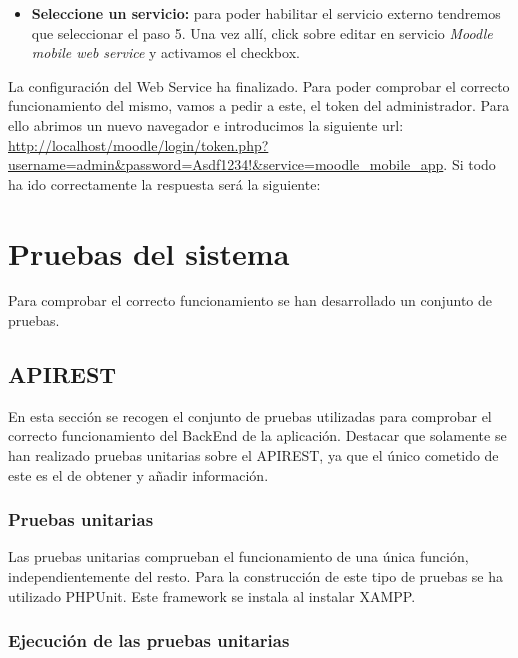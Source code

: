 \begin{itemize}
\begin{itemize}
		\item \textbf{Seleccione un servicio:} para poder habilitar el servicio externo tendremos que seleccionar el paso 5. Una vez allí, click sobre editar en servicio \emph{Moodle mobile web service} y activamos el checkbox.
		
	
	\end{itemize}
	
La configuración del Web Service ha finalizado. Para poder comprobar el correcto funcionamiento del mismo, vamos a pedir a este, el token del administrador. Para ello abrimos un nuevo navegador e introducimos la siguiente url: \url{http://localhost/moodle/login/token.php?username=admin&password=Asdf1234!&service=moodle_mobile_app}. Si todo ha ido correctamente la respuesta será la siguiente:
	
\end{itemize}

\section{Pruebas del sistema}

Para comprobar el correcto funcionamiento se han desarrollado un conjunto de pruebas.

\subsection{APIREST}
En esta sección se recogen el conjunto de pruebas utilizadas para comprobar el correcto funcionamiento del BackEnd de la aplicación. Destacar que solamente se han realizado pruebas unitarias sobre el APIREST, ya que el único cometido de este es el de obtener y añadir información.

\subsubsection{Pruebas unitarias}

Las pruebas unitarias comprueban el funcionamiento de una única función, independientemente del resto. Para la construcción de este tipo de pruebas se ha utilizado PHPUnit. Este framework se instala al instalar XAMPP.

\subsubsection{Ejecución de las pruebas unitarias}

